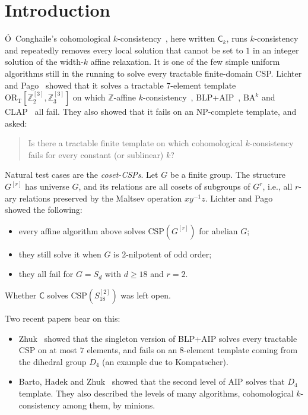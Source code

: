 \documentclass[11pt]{article}
\theoremstyle{definition}
\theoremstyle{remark}
\newcommand{\Csp}{\mathrm{CSP}}
\newcommand{\Coh}{\mathsf{C}}
\newcommand{\Z}{\mathbb Z}
\newcommand{\ORT}{\mathrm{OR}_{\mathrm T}}
\begin{document}
\section{Introduction}

Ó~Conghaile's cohomological $k$-consistency~\cite{OC22}, here written $\Coh_k$,
runs $k$-consistency and repeatedly removes every local solution that cannot be
set to $1$ in an integer solution of the width-$k$ affine relaxation. It is one
of the few simple uniform algorithms still in the running to solve every
tractable finite-domain CSP. Lichter and Pago~\cite{LP25} showed that it solves
a tractable 7-element template $\ORT[\Z_2^{[3]},\Z_3^{[3]}]$ on which
$\Z$-affine $k$-consistency~\cite{DO24}, BLP+AIP~\cite{BGWZ20}, $\mathrm{BA}^k$
and CLAP~\cite{CZ23} all fail. They also showed that it fails on an NP-complete
template, and asked:

\begin{quote}
Is there a tractable finite template on which cohomological $k$-consistency
fails for every constant (or sublinear) $k$?
\end{quote}

Natural test cases are the \emph{coset-CSPs}. Let $G$ be a finite group. The
structure $G^{[r]}$ has universe $G$, and its relations are all cosets of
subgroups of $G^r$, i.e., all $r$-ary relations preserved by the Maltsev operation
$xy^{-1}z$. Lichter and Pago~\cite[Thm.~1.2]{LP25} showed the following:
\begin{itemize}
\item every affine algorithm above solves $\Csp(G^{[r]})$ for abelian $G$;
\item they still solve it when $G$ is $2$-nilpotent of odd order;
\item they all fail for $G=S_d$ with $d\ge 18$ and $r=2$.
\end{itemize}
Whether $\Coh$ solves $\Csp(S_{18}^{[2]})$ was left open.

Two recent papers bear on this:
\begin{itemize}
\item Zhuk~\cite{Zhu25} showed that the singleton version of BLP+AIP solves
every tractable CSP on at most $7$ elements, and fails on an 8-element template
coming from the dihedral group $D_4$ (an example due to Kompatscher).
\item Barto, Hadek and Zhuk~\cite{BHZ26} showed that the second level of AIP
solves that $D_4$ template. They also described the levels of many algorithms,
cohomological $k$-consistency among them, by minions.
\end{itemize}
\end{document}
